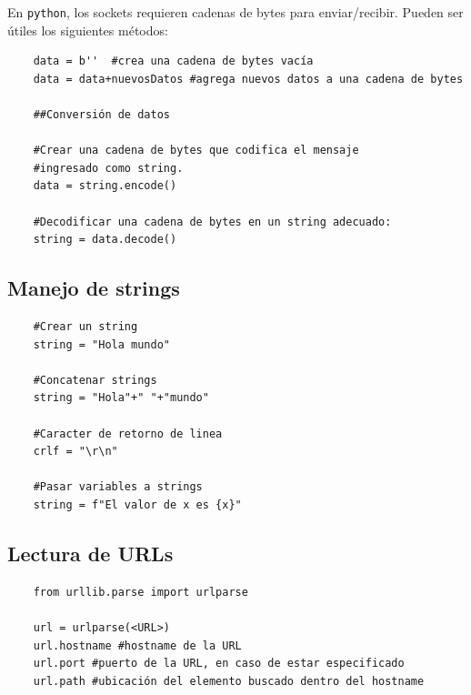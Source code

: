 \documentclass[a4paper,10pt]{article}
\begin{document}
En \texttt{python}, los sockets requieren cadenas de bytes para enviar/recibir. Pueden ser útiles los siguientes métodos:

\begin{verbatim}
    data = b''  #crea una cadena de bytes vacía
    data = data+nuevosDatos #agrega nuevos datos a una cadena de bytes

    ##Conversión de datos

    #Crear una cadena de bytes que codifica el mensaje 
    #ingresado como string.
    data = string.encode() 

    #Decodificar una cadena de bytes en un string adecuado:
    string = data.decode()
\end{verbatim}

\subsection*{Manejo de strings}

\begin{verbatim}
    #Crear un string
    string = "Hola mundo"
    
    #Concatenar strings
    string = "Hola"+" "+"mundo"

    #Caracter de retorno de linea
    crlf = "\r\n"

    #Pasar variables a strings
    string = f"El valor de x es {x}"
\end{verbatim}


\subsection*{Lectura de URLs}

\begin{verbatim}
    from urllib.parse import urlparse

    url = urlparse(<URL>)
    url.hostname #hostname de la URL
    url.port #puerto de la URL, en caso de estar especificado
    url.path #ubicación del elemento buscado dentro del hostname
\end{verbatim}
\end{document}
